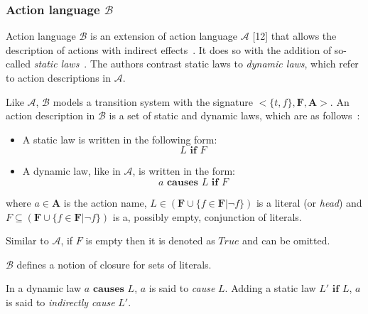 \subsubsection{Action language $ \mathcal{B} $}
\label{subsubsec:action_language_b}

Action language $ \mathcal{B} $ is an extension of action language $ \mathcal{A} $ [12] that allows the description of actions with indirect effects~\citep{gelfond_action_1998}.
It does so with the addition of so-called \textit{static laws}~\citep{gelfond_action_1998}.
The authors contrast static laws to \textit{dynamic laws}, which refer to action descriptions in $\mathcal{A}$.

Like $\mathcal{A}$, $\mathcal{B}$ models a transition system with the signature $<\{t, f\},\boldsymbol{F},\boldsymbol{A}>$.
An action description in $\mathcal{B}$ is a set of static and dynamic laws, which are as follows~\citep{gelfond_action_1998}:

\begin{itemize}
    \item A static law is written in the following form:
        \begin{equation}
            L \textbf{ if } F
        \end{equation}

    \item A dynamic law, like in $\mathcal{A}$, is written in the form:
        \begin{equation}
            a \textbf{ causes } L \textbf{ if } F
        \end{equation}
\end{itemize}

\noindent
where $a \in \boldsymbol{A}$ is the action name, $L \in(\boldsymbol{F} \cup\{f \in \boldsymbol{F}| \neg f\})$ is a literal (or \textit{head}) and $F \subseteq(\boldsymbol{F} \cup\{f \in \boldsymbol{F}| \neg f\})$ is a, possibly empty, conjunction of literals.

Similar to $\mathcal{A}$, if $F$ is empty then it is denoted as $True$ and can be omitted.

$\mathcal{B}$ defines a notion of closure for sets of literals.

\begin{definition}
    \label{def:causation}
    In a dynamic law $a \textbf{ causes } L$, $a$ is said to \textit{cause} $L$.
    Adding a static law $L' \textbf{ if } L$, $a$ is said to \textit{indirectly cause} $L'$.
\end{definition}

